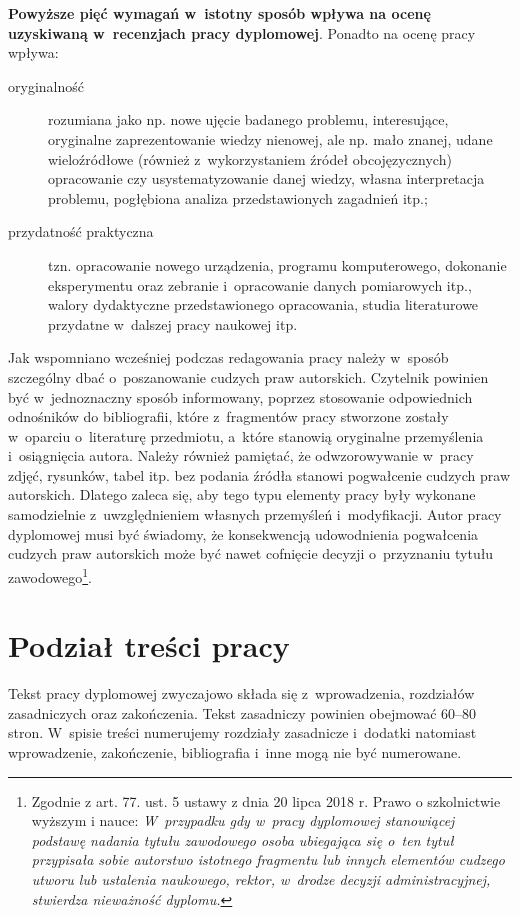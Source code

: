 \documentclass[skorowidz,skroty]{dyplomWEZUT}
\begin{document}
\noindent\textbf{Powyższe pięć wymagań w~istotny sposób wpływa na ocenę uzyskiwaną w~recenzjach pracy dyplomowej}. Ponadto na ocenę pracy wpływa:

\begin{description}
\item [oryginalność] rozumiana jako np. nowe ujęcie badanego problemu, interesujące, oryginalne zaprezentowanie wiedzy nienowej, ale np. mało znanej, udane wieloźródłowe (również z~wykorzystaniem źródeł obcojęzycznych) opracowanie czy usystematyzowanie danej wiedzy, własna interpretacja problemu, pogłębiona analiza przedstawionych zagadnień itp.;
\item [przydatność praktyczna] tzn. opracowanie nowego urządzenia, programu komputerowego, dokonanie eksperymentu oraz zebranie i~opracowanie danych pomiarowych itp., walory dydaktyczne przedstawionego opracowania, studia literaturowe przydatne w~dalszej pracy naukowej itp.
\end{description}

\noindent Jak wspomniano wcześniej podczas redagowania pracy należy w~sposób szczególny dbać o~poszanowanie cudzych praw autorskich. Czytelnik powinien być w~jednoznaczny sposób informowany, poprzez stosowanie odpowiednich odnośników do bibliografii, które z~fragmentów pracy stworzone zostały w~oparciu o~literaturę przedmiotu, a~które stanowią oryginalne przemyślenia i~osiągnięcia autora. Należy również pamiętać, że odwzorowywanie w~pracy zdjęć, rysunków, tabel itp. bez podania źródła stanowi pogwałcenie cudzych praw autorskich. Dlatego zaleca się, aby tego typu elementy pracy były wykonane samodzielnie z~uwzględnieniem własnych przemyśleń i~modyfikacji. Autor pracy dyplomowej musi być świadomy, że konsekwencją udowodnienia pogwałcenia cudzych praw autorskich może być nawet cofnięcie decyzji o~przyznaniu tytułu zawodowego\footnote{Zgodnie z art. 77. ust. 5 ustawy z dnia 20 lipca 2018 r. Prawo o szkolnictwie wyższym i nauce:  \textit{W~przypadku  gdy w~pracy dyplomowej stanowiącej podstawę nadania tytułu zawodowego  osoba ubiegająca się o~ten tytuł przypisała sobie autorstwo istotnego fragmentu lub innych elementów cudzego utworu lub ustalenia naukowego, rektor, w~drodze decyzji administracyjnej, stwierdza nieważność dyplomu.}}.

\section{Podział treści pracy}\label{sec:podzialtresci}

Tekst pracy dyplomowej zwyczajowo składa się z~wprowadzenia, rozdziałów zasadniczych oraz zakończenia. Tekst zasadniczy powinien obejmować 60--80 stron. W~spisie treści numerujemy rozdziały zasadnicze i~dodatki natomiast wprowadzenie, zakończenie, bibliografia i~inne mogą nie być numerowane.
\end{document}
